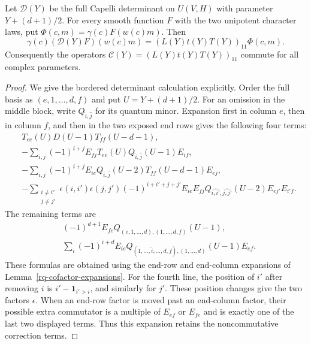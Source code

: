 \begin{lemma}\label{rr-radial-capelli}
Let $\mathcal D(Y)$ be the full Capelli determinant on
$U(V,H)$ with parameter $Y+(d+1)/2$.
For every smooth function $F$ with the two unipotent
character laws, put
$\Phi(c,m)=\gamma(c)F(w(c)m)$.
Then
\begin{equation}\label{rr-sandwich}
 \gamma(c)(\mathcal D(Y)F)(w(c)m)
                         =(L(Y)t(Y)T(Y))_{11}\Phi(c,m).
\end{equation}
Consequently the operators
$\mathcal C(Y)=(L(Y)t(Y)T(Y))_{11}$ commute
for all complex parameters.
\end{lemma}

\begin{proof}
We give the bordered determinant calculation explicitly.
Order the full basis as $(e,1,\ldots,d,f)$ and put
$U=Y+(d+1)/2$.  For an omission in the middle block,
write $Q_{\widehat i,\widehat j}$ for its quantum minor.
Expansion first in column $e$, then in column $f$,
and then in the two exposed end rows gives the following
four terms:
\begin{align*}
 &T_{ee}(U)D(U-1)T_{ff}(U-d-1),\\
 &-\sum_{i,j}(-1)^{i+j}
      E_{fj}T_{ee}(U)Q_{\widehat i,\widehat j}(U-1)E_{if},\\
 &-\sum_{i,j}(-1)^{i+j}
      E_{ie}Q_{\widehat i,\widehat j}(U-2)
                        T_{ff}(U-d-1)E_{ej},\\
 &-\sum_{\substack{i\ne i'\\j\ne j'}}
   \epsilon(i,i')\epsilon(j,j')(-1)^{i+i'+j+j'}
   E_{ie}E_{fj}Q_{\widehat{i,i'},\widehat{j,j'}}(U-2)
                                      E_{ej'}E_{i'f}.
\end{align*}
The remaining terms are
\begin{align*}
 &(-1)^{d+1}E_{fe}Q_{(e,1,\ldots,d),(1,\ldots,d,f)}(U-1),\\
 &\sum_i(-1)^{i+d}E_{ie}
       Q_{(1,\ldots,\widehat i,\ldots,d,f),(1,\ldots,d)}(U-1)E_{ef}.
\end{align*}
These formulas are obtained using the end-row and
end-column expansions of Lemma~\ref{rq-cofactor-expansions}.
For the fourth line, the position of $i'$ after removing
$i$ is $i'-\mathbf1_{i'>i}$, and similarly for $j'$.
These position changes give the two factors $\epsilon$.
When an end-row factor is moved past an end-column
factor, their possible extra commutator is a multiple
of $E_{ef}$ or $E_{fe}$ and is exactly one of the last
two displayed terms.  Thus this expansion retains the
noncommutative correction terms.


\end{proof}
